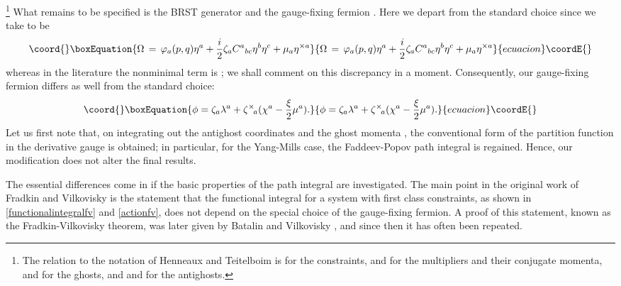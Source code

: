 \documentclass[a4paper,10pt]{article}
\begin{document}
\footnote{The relation to the notation of Henneaux and Teitelboim \cite{Henn 92} is 
\coordHE{} for the constraints, \coordHE{}  and 
\coordHE{} for the multipliers and their conjugate momenta, \coordHE{} 
and \coordHE{} for the ghosts, and 
\coordHE{} and \coordHE{} for the 
antighosts.} 
What remains to be specified is the BRST generator \myHighlight{$\Omega$}\coordHE{} and the gauge-fixing fermion 
\myHighlight{$\phi$}\coordHE{}. Here we depart from the standard choice since we take \myHighlight{$\Omega$}\coordHE{} to be
\begin{equation}\coord{}\boxEquation{\label{brsqcorrected}
\Omega\,=\,\varphi_a(p,q)\eta^a+\frac{i}{2}\zeta_aC^a{}_{bc}\eta^b\eta^c+\mu_a
\eta^{\times a}
}{\Omega\,=\,\varphi_a(p,q)\eta^a+\frac{i}{2}\zeta_aC^a{}_{bc}\eta^b\eta^c+\mu_a
\eta^{\times a}
}{ecuacion}\coordE{}\end{equation}
whereas in the literature the nonminimal term is \coordHE{}; we shall 
comment on this discrepancy in a moment. Consequently, our gauge-fixing fermion differs  
as well from the standard choice:
\begin{equation}\coord{}\boxEquation{\label{gaugefixingfermionfinalversion}
\phi=\zeta_a\lambda^a+\zeta^{\times}{\!}_a(\chi^a-\frac{\xi}{2}\mu^a).
}{\phi=\zeta_a\lambda^a+\zeta^{\times}{\!}_a(\chi^a-\frac{\xi}{2}\mu^a).
}{ecuacion}\coordE{}\end{equation}
Let us first note that, on integrating out the antighost coordinates \myHighlight{$\eta^{\times}$}\coordHE{} 
and the ghost momenta \myHighlight{$\zeta$}\coordHE{}, the conventional form of the partition function in the 
derivative gauge is obtained; in particular, for the Yang-Mills case, the Faddeev-Popov 
path integral \cite{Fadd 67,Fadd 80} is regained. Hence, our modification does not alter 
the final results.

The essential differences come in if the basic properties of the path integral are 
investigated. The main point in the original work of Fradkin and Vilkovisky \cite{Frad 
75} is the statement that the functional integral for a system with first class 
constraints, as shown in \eqref{functionalintegralfv} and \eqref{actionfv}, does not 
depend on the special choice of the gauge-fixing fermion. A proof of this statement, 
known as the Fradkin-Vilkovisky theorem, was later given by Batalin and Vilkovisky 
\cite{Bata 77}, and since then it has often been repeated. 
\end{document}
